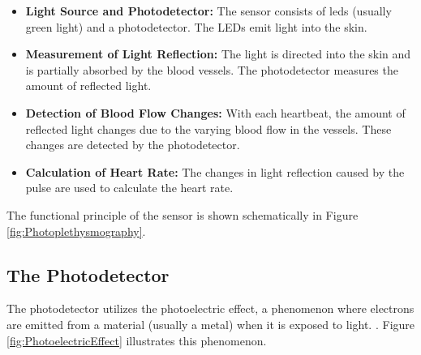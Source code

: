 {\begin{center}
        
        \label{fig:Photoplethysmography}	
    \end{center}
    
    \begin{itemize}
        \item \textbf{Light Source and Photodetector:} The sensor consists of \ac{led}s (usually green light) and a photodetector. The LEDs emit light into the skin.
        \item \textbf{Measurement of Light Reflection:} The light is directed into the skin and is partially absorbed by the blood vessels. The photodetector measures the amount of reflected light.
        \item \textbf{Detection of Blood Flow Changes:} With each heartbeat, the amount of reflected light changes due to the varying blood flow in the vessels. These changes are detected by the photodetector.
        \item \textbf{Calculation of Heart Rate:} The changes in light reflection caused by the pulse are used to calculate the heart rate.
    \end{itemize}
    
    
    The functional principle of the sensor is shown schematically in Figure \ref{fig:Photoplethysmography}.
    
    \subsection{The Photodetector}
    
    
    The photodetector utilizes the photoelectric effect, a phenomenon where electrons are emitted from a material (usually a metal) when it is exposed to light. \cite{Traenkler:2014}.
    Figure \ref{fig:PhotoelectricEffect} illustrates this phenomenon.
    
}
